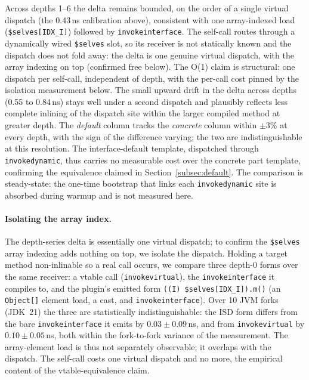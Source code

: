 \documentclass[acmsmall,nonacm]{acmart}
\theoremstyle{acmplain}
\theoremstyle{acmdefinition}
\newcommand{\code}[1]{\texttt{#1}}
\begin{document}
\noindent
Across depths 1--6 the delta remains bounded, on the order of a single virtual
dispatch (the 0.43\,ns calibration above), consistent with one array-indexed load
(\code{\$selves[IDX\_I]}) followed by \code{invokeinterface}. The self-call routes
through a dynamically wired \code{\$selves} slot, so its receiver is not statically
known and the dispatch does not fold away: the delta is one genuine virtual
dispatch, with the array indexing on top (confirmed free below). The O(1) claim is
structural: one dispatch per self-call, independent of depth, with the per-call
cost pinned by the isolation measurement below. The small upward drift in the
delta across depths (0.55 to 0.84\,ns) stays well under a second dispatch and
plausibly reflects less complete inlining of the dispatch site within the larger
compiled method at greater depth. The \emph{default} column tracks the \emph{concrete}
column within $\pm$3\% at every depth, with the sign of the difference varying;
the two are indistinguishable at this resolution. The interface-default template,
dispatched through \code{invokedynamic}, thus carries no measurable cost over the
concrete part template, confirming the equivalence claimed in
Section~\ref{subsec:default}. The comparison is steady-state: the one-time
bootstrap that links each \code{invokedynamic} site is absorbed during warmup and
is not measured here.

\paragraph{Isolating the array index.}
The depth-series delta is essentially one virtual dispatch; to confirm the
\code{\$selves} array indexing adds nothing on top, we isolate the dispatch.
Holding a target method non-inlinable so a real call occurs, we compare three
depth-0 forms over the same receiver: a vtable call (\code{invokevirtual}), the
\code{invokeinterface} it compiles to, and the plugin's emitted form
\code{((I)\,\$selves[IDX\_I]).m()} (an \code{Object[]} element load, a cast, and
\code{invokeinterface}). Over 10 JVM forks (JDK~21) the three are statistically
indistinguishable: the ISD form differs from the bare \code{invokeinterface} it
emits by $0.03\pm0.09$\,ns, and from \code{invokevirtual} by $0.10\pm0.05$\,ns,
both within the fork-to-fork variance of the measurement. The array-element load
is thus not separately observable; it overlaps with the dispatch. The self-call
costs one virtual dispatch and no more, the empirical content of the
vtable-equivalence claim.
\end{document}
